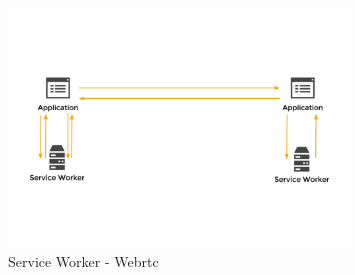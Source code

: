 %
%

\begin{figure}[!h]
	\centering
	\includegraphics[width=0.8\textwidth]{figures/service_worker_app}
	\caption[A Figure Short-Title]{Service Worker - Webrtc}
	\label{fig:mesh}
\end{figure}

